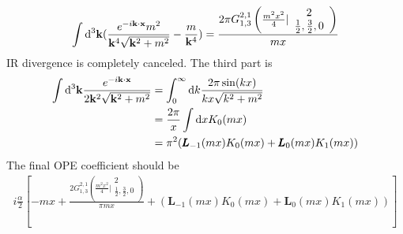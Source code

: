 \documentclass{article}
\renewcommand{\a}{\alpha}
\begin{document}
\begin{align*}
  \int\dd^3\vb{k}(\frac{e^{-i\vb{k\cdot x}}m^2}{\vb{k}^4\sqrt{\vb{k}^2+m^2}}-\frac{m}{\vb{k}^4})=\frac{2 \pi  G_{1,3}^{2,1}\left(\frac{m^2 x^2}{4}|
\begin{array}{c}
 2 \\
 \frac{1}{2},\frac{3}{2},0 \\
\end{array}
\right)}{m x}
\end{align*}
IR divergence is completely canceled. The third part is
\begin{align*}
  \int\dd^3\vb{k}\frac{e^{-i\vb{k\cdot x}}}{2\vb{k}^2\sqrt{\vb{k}^2+m^2} }&=\int_{0}^{\infty}\dd k\frac{2 \pi  \sin (k x)}{k x \sqrt{k^2+m^2}}\\
  &=\frac{2\pi}{x}\int\dd xK_0(mx)\\
  &=\pi ^2 (\pmb{L}_{-1}(m x) K_0(m x)+\pmb{L}_0(m x) K_1(m x))
\end{align*}
The final OPE coefficient should be
\begin{align*}
  i\frac{\a}{2}[-mx+\frac{2   G_{1,3}^{2,1}\left(\frac{m^2 x^2}{4}|
\begin{array}{c}
 2 \\
 \frac{1}{2},\frac{3}{2},0 \\
\end{array}
\right)}{\pi m x}+(\pmb{L}_{-1}(m x) K_0(m x)+\pmb{L}_0(m x) K_1(m x))]
\end{align*}
\end{document}

